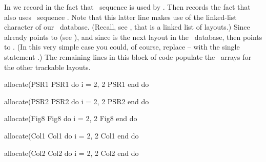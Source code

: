 In  we record in  the fact that \DNA\ sequence  is used by . Then  records the fact that  also uses \DNA\ sequence . Note that this latter line makes use of the linked-list character of our \DNA\ database. (Recall, see , that  is a linked list of layouts.) Since  already points to  (see ), and since  is the next layout in the \DNA\ database, then  points to . (In this very simple case you could, of course, replace -- with the single statement .) The remaining lines in this block of code populate the \DNA\ arrays for the other trackable layouts.
%
\begin{ptccode}
allocate(PSR1%
PSR1%
do i = 2, 2                                   \label{lin:dna.bdo}
  PSR1%
end do                                        \label{lin:dna.edo}

allocate(PSR2%
PSR2%
do i = 2, 2
  PSR2%
end do

allocate(Fig8%
Fig8%
do i = 2, 2
  Fig8%
end do

allocate(Col1%
Col1%
do i = 2, 2
  Col1%
end do

allocate(Col2%
Col2%
do i = 2, 2
  Col2%
end do
\end{ptccode}


\makeussubscript
\endinput
